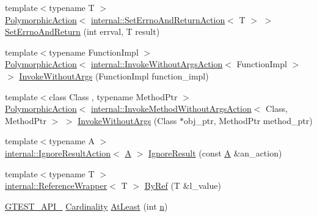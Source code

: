 \begin{DoxyCompactItemize}
\item 
{\footnotesize template$<$typename T $>$ }\\\hyperlink{classtesting_1_1PolymorphicAction}{Polymorphic\+Action}$<$ \hyperlink{classtesting_1_1internal_1_1SetErrnoAndReturnAction}{internal\+::\+Set\+Errno\+And\+Return\+Action}$<$ T $>$ $>$ \hyperlink{namespacetesting_a31095e421f167fade2e6d4d60df1f4da}{Set\+Errno\+And\+Return} (int errval, T result)
\item 
{\footnotesize template$<$typename Function\+Impl $>$ }\\\hyperlink{classtesting_1_1PolymorphicAction}{Polymorphic\+Action}$<$ \hyperlink{classtesting_1_1internal_1_1InvokeWithoutArgsAction}{internal\+::\+Invoke\+Without\+Args\+Action}$<$ Function\+Impl $>$ $>$ \hyperlink{namespacetesting_a88cc1999296bc630f6a49cdf66bb21f9}{Invoke\+Without\+Args} (Function\+Impl function\+\_\+impl)
\item 
{\footnotesize template$<$class Class , typename Method\+Ptr $>$ }\\\hyperlink{classtesting_1_1PolymorphicAction}{Polymorphic\+Action}$<$ \hyperlink{classtesting_1_1internal_1_1InvokeMethodWithoutArgsAction}{internal\+::\+Invoke\+Method\+Without\+Args\+Action}$<$ Class, Method\+Ptr $>$ $>$ \hyperlink{namespacetesting_ab75325d71a8c37db94f349243815c728}{Invoke\+Without\+Args} (Class $\ast$obj\+\_\+ptr, Method\+Ptr method\+\_\+ptr)
\item 
{\footnotesize template$<$typename A $>$ }\\\hyperlink{classtesting_1_1internal_1_1IgnoreResultAction}{internal\+::\+Ignore\+Result\+Action}$<$ \hyperlink{namespacetesting_a5e9134d655d2fc9323902348083282e7}{A} $>$ \hyperlink{namespacetesting_a50ae42540a31047c7fddd32df8d835f5}{Ignore\+Result} (const \hyperlink{namespacetesting_a5e9134d655d2fc9323902348083282e7}{A} \&an\+\_\+action)
\item 
{\footnotesize template$<$typename T $>$ }\\\hyperlink{classtesting_1_1internal_1_1ReferenceWrapper}{internal\+::\+Reference\+Wrapper}$<$ T $>$ \hyperlink{namespacetesting_aaee6d42dcd69de6e7a1459c5c71222c3}{By\+Ref} (T \&l\+\_\+value)
\item 
\hyperlink{gtest-port_8h_aa73be6f0ba4a7456180a94904ce17790}{G\+T\+E\+S\+T\+\_\+\+A\+P\+I\+\_\+} \hyperlink{classtesting_1_1Cardinality}{Cardinality} \hyperlink{namespacetesting_a137297cb3c582843989fbd937cf0fed2}{At\+Least} (int \hyperlink{app_2main_8cpp_acfc02ec89670db29251fda6a66602ce2}{n})
\item 

\end{DoxyCompactItemize}

